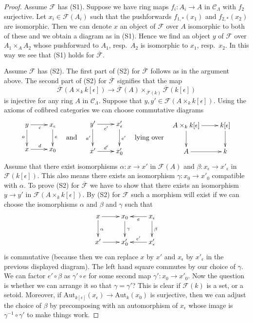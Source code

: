\begin{proof}
Assume $\mathcal{F}$ has (S1).
Suppose we have ring maps $f_i : A_i \to A$ in $\mathcal{C}_\Lambda$
with $f_2$ surjective. Let $x_i \in \mathcal{F}(A_i)$ such that
the pushforwards $f_{1, *}(x_1)$ and $f_{2, *}(x_2)$ are isomorphic.
Then we can denote $x$ an object of $\mathcal{F}$ over $A$ isomorphic
to both of these and we obtain a diagram as in (S1). Hence we find
an object $y$ of $\mathcal{F}$ over $A_1 \times_A A_2$ whose pushforward
to $A_1$, resp.\ $A_2$ is isomorphic to $x_1$, resp.\ $x_2$. In this way
we see that (S1) holds for $\overline{\mathcal{F}}$.

\medskip\noindent
Assume $\mathcal{F}$ has (S2).
The first part of (S2) for $\overline{\mathcal{F}}$ follows as in
the argument above. The second part of (S2) for
$\overline{\mathcal{F}}$ signifies that the map
$$
\overline{\mathcal{F}}(A \times_{k} k[\epsilon]) \to
\overline{\mathcal{F}}(A)
\times_{\overline{\mathcal{F}}(k)} \overline{\mathcal{F}}(k[\epsilon])
$$
is injective for any ring $A$ in $\mathcal{C}_\Lambda$. Suppose that
$y, y' \in \mathcal{F}(A \times_k k[\epsilon])$. Using the axioms
of cofibred categories we can choose commutative diagrams
$$
\vcenter{
\xymatrix{
y \ar[r]_c \ar[d]_a & x_\epsilon \ar[d]^e \\
x \ar[r]^d          & x_0
}
}
\quad\text{and}\quad
\vcenter{
\xymatrix{
y' \ar[r]_{c'} \ar[d]_{a'} & x'_\epsilon \ar[d]^{e'} \\
x' \ar[r]^{d'}                 & x'_0
}
}
\quad\text{lying over}\quad
\vcenter{
\xymatrix{
A \times_k k[\epsilon] \ar[d] \ar[r] & k[\epsilon] \ar[d] \\
A \ar[r] & k
}
}
$$
Assume that there exist isomorphisms
$\alpha : x \to x'$ in $\mathcal{F}(A)$ and
$\beta : x_\epsilon \to x'_\epsilon$ in $\mathcal{F}(k[\epsilon])$.
This also means there exists an isomorphism $\gamma : x_0 \to x'_0$
compatible with $\alpha$. To prove (S2) for $\overline{\mathcal{F}}$
we have to show that there exists an isomorphism $y \to y'$ in
$\mathcal{F}(A \times_k k[\epsilon])$.
By (S2) for $\mathcal{F}$ such a morphism will exist if we can
choose the isomorphisms $\alpha$ and $\beta$ and $\gamma$ such that
$$
\xymatrix{
x \ar[d]^\alpha \ar[r] & x_0 \ar[d]^\gamma &
x_\epsilon \ar[d]^\beta \ar[l]^e \\
x' \ar[r] & x'_0 & x'_\epsilon \ar[l]_{e'}
}
$$
is commutative (because then we can replace $x$ by $x'$ and $x_\epsilon$
by $x'_\epsilon$ in the previous displayed diagram). The left hand square
commutes by our choice of $\gamma$. We can factor $e' \circ \beta$ as
$\gamma' \circ e$ for some second map
$\gamma' : x_0 \to x'_0$. Now the question is whether we can arrange it so
that $\gamma = \gamma'$? This is clear if $\mathcal{F}(k)$ is a set, or a
setoid. Moreover, if
$\text{Aut}_{k[\epsilon]}(x_\epsilon) \to \text{Aut}_k(x_0)$
is surjective, then we can adjust the choice of $\beta$ by precomposing
with an automorphism of $x_\epsilon$ whose image is
$\gamma^{-1} \circ \gamma'$ to make things work.
\end{proof}

